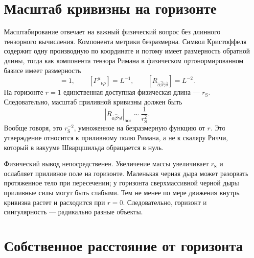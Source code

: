 \begin{classroomqa}
\end{classroomqa}

\section{Масштаб кривизны на горизонте}

Масштабирование отвечает на важный физический вопрос без длинного тензорного вычисления. Компонента метрики безразмерна. Символ Кристоффеля содержит одну производную по координате и потому имеет размерность обратной длины, тогда как компонента тензора Римана в физическом ортонормированном базисе имеет размерность
\begin{equation}
[g_{\mu\nu}]=1,
\qquad
[\Gamma^\mu{}_{\nu\rho}]=L^{-1},
\qquad
[R_{\hat\alpha\hat\beta\hat\gamma\hat\delta}]
=L^{-2}.
\label{eq:l7-curvature-dimensions}
\end{equation}
На горизонте \(r=1\) единственная доступная физическая длина —
\(r_{\mathrm S}\). Следовательно, масштаб приливной кривизны должен быть
\begin{equation}
\left|R_{\hat\alpha\hat\beta\hat\gamma\hat\delta}\right|_{\mathrm{hor}}
\sim \frac{1}{r_{\mathrm S}^2}.
\label{eq:l7-horizon-curvature}
\end{equation}
Вообще говоря, это \(r_{\mathrm S}^{-2}\), умноженное на безразмерную функцию от
\(r\). Это утверждение относится к приливному полю Римана, а не к скаляру Риччи, который в вакууме Шварцшильда обращается в нуль.

Физический вывод непосредственен. Увеличение массы увеличивает
\(r_{\mathrm S}\) и ослабляет приливное поле на горизонте. Маленькая черная дыра может разорвать протяженное тело при пересечении; у горизонта сверхмассивной черной дыры приливные силы могут быть слабыми. Тем не менее по мере движения внутрь кривизна растет и расходится при \(r=0\). Следовательно, горизонт и сингулярность — радикально разные объекты.

\section{Собственное расстояние от горизонта}

